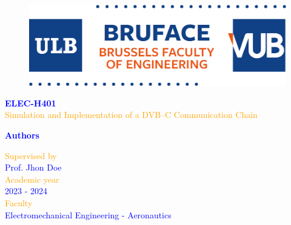 \begin{titlepage}
	\begin{center}
            \begin{figure}
                \centering
                \includegraphics[scale=0.3]{Images/logo.png}
            \end{figure}
		\vspace*{\fill}
            \normalsize
            {\selectfont
            \textcolor{blue}{\textbf{ELEC-H401}}}\\
            \vspace{0.2cm}
		\Huge
            {\selectfont
            \textcolor{orange}{Simulation and Implementation of a DVB–C Communication Chain}}\\
        \end{center}
	\begin{center}	
		\vspace{0.5cm}
            \Large
            {\selectfont
		\textcolor{blue}{\textbf{Authors}}}\\
	\end{center}
        \vspace*{\fill}
        \begin{FlushRight}
            {\selectfont
            \textcolor{orange}{Supervised by }}\\
            {\selectfont
            \textcolor{blue}{Prof. Jhon Doe}}\\
            \vspace{0.4cm}
            {\selectfont
            \textcolor{orange}{Academic year}}\\
            {\selectfont
            \textcolor{blue}{2023 - 2024}}\\
            \vspace{0.4cm}
            {\selectfont
            \textcolor{orange}{Faculty}}\\
            {\selectfont
            \textcolor{blue}{Electromechanical Engineering - Aeronautics}}
        \end{FlushRight}
\end{titlepage}